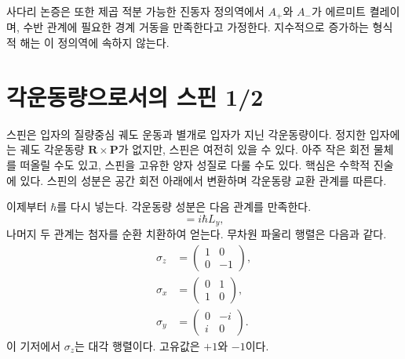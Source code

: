 사다리 논증은 또한 제곱 적분 가능한 진동자 정의역에서 \(A_{+}\)와 \(A_{-}\)가 에르미트 켤레이며, 수반 관계에 필요한 경계 거동을 만족한다고 가정한다. 지수적으로 증가하는 형식적 해는 이 정의역에 속하지 않는다.

\begin{classroomqa}
\end{classroomqa}

\section{각운동량으로서의 스핀 1/2}

스핀은 입자의 질량중심 궤도 운동과 별개로 입자가 지닌 각운동량이다. 정지한 입자에는 궤도 각운동량 \(\mathbf R\times\mathbf P\)가 없지만, 스핀은 여전히 있을 수 있다. 아주 작은 회전 물체를 떠올릴 수도 있고, 스핀을 고유한 양자 성질로 다룰 수도 있다. 핵심은 수학적 진술에 있다. 스핀의 성분은 공간 회전 아래에서 변환하며 각운동량 교환 관계를 따른다.

이제부터 \(\hbar\)를 다시 넣는다. 각운동량 성분은 다음 관계를 만족한다.
\begin{equation}
[L_{z},L_{x}]=i\hbar L_{y},
\end{equation}
나머지 두 관계는 첨자를 순환 치환하여 얻는다. 무차원 파울리 행렬은 다음과 같다.
\begin{equation}
\begin{aligned}
\sigma_{z}&=
\begin{pmatrix}
1&0\\
0&-1
\end{pmatrix},\\[0.4em]
\sigma_{x}&=
\begin{pmatrix}
0&1\\
1&0
\end{pmatrix},\\[0.4em]
\sigma_{y}&=
\begin{pmatrix}
0&-i\\
i&0
\end{pmatrix}.
\end{aligned}
\end{equation}
이 기저에서 \(\sigma_{z}\)는 대각 행렬이다. 고유값은 \(+1\)와
\(-1\)이다.

\begin{classroomqa}
\end{classroomqa}

